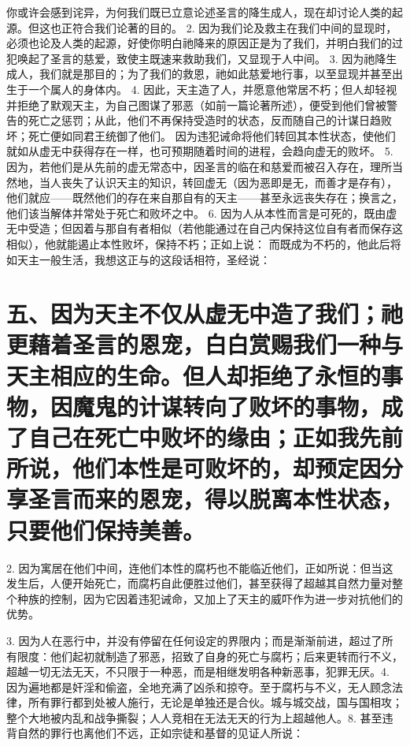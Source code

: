 你或许会感到诧异，为何我们既已立意论述圣言的降生成人，现在却讨论人类的起源。但这也正符合我们论著的目的。 2. 因为我们论及救主在我们中间的显现时，必须也论及人类的起源，好使你明白祂降来的原因正是为了我们，并明白我们的过犯唤起了圣言的慈爱，致使主既速来救助我们，又显现于人中间。 3. 因为祂降生成人，我们就是那目的；为了我们的救恩，祂如此慈爱地行事，以至显现并甚至出生于一个属人的身体内。 4. 因此，天主造了人，并愿意他常居不朽；但人却轻视并拒绝了默观天主，为自己图谋了邪恶（如前一篇论著所述），便受到他们曾被警告的死亡之惩罚；从此，他们不再保持受造时的状态，反而随自己的计谋日趋败坏；死亡便如同君王统御了他们。 因为违犯诫命将他们转回其本性状态，使他们就如从虚无中获得存在一样，也可预期随着时间的进程，会趋向虚无的败坏。 5. 因为，若他们是从先前的虚无常态中，因圣言的临在和慈爱而被召入存在，理所当然地，当人丧失了认识天主的知识，转回虚无（因为恶即是无，而善才是存有），他们就应——既然他们的存在来自那自有的天主——甚至永远丧失存在；换言之，他们该当解体并常处于死亡和败坏之中。 6. 因为人从本性而言是可死的，既由虚无中受造；但因着与那自有者相似（若他能通过在自己内保持这位自有者而保存这相似），他就能遏止本性败坏，保持不朽；正如上说： 而既成为不朽的，他此后将如天主一般生活，我想这正与的这段话相符，圣经说：\par


\section{五、因为天主不仅从虚无中造了我们；祂更藉着圣言的恩宠，白白赏赐我们一种与天主相应的生命。但人却拒绝了永恒的事物，因魔鬼的计谋转向了败坏的事物，成了自己在死亡中败坏的缘由；正如我先前所说，他们本性是可败坏的，却预定因分享圣言而来的恩宠，得以脱离本性状态，只要他们保持美善。}

2. 因为寓居在他们中间，连他们本性的腐朽也不能临近他们，正如所说：但当这发生后，人便开始死亡，而腐朽自此便胜过他们，甚至获得了超越其自然力量对整个种族的控制，因为它因着违犯诫命，又加上了天主的威吓作为进一步对抗他们的优势。\par

3. 因为人在恶行中，并没有停留在任何设定的界限内；而是渐渐前进，超过了所有限度：他们起初就制造了邪恶，招致了自身的死亡与腐朽；后来更转而行不义，超越一切无法无天，不只限于一种恶，而是相继发明各种新恶事，犯罪无厌。4. 因为遍地都是奸淫和偷盗，全地充满了凶杀和掠夺。至于腐朽与不义，无人顾念法律，所有罪行都到处被人施行，无论是单独还是合伙。城与城交战，国与国相攻；整个大地被内乱和战争撕裂；人人竞相在无法无天的行为上超越他人。8. 甚至违背自然的罪行也离他们不远，正如宗徒和基督的见证人所说：\par

